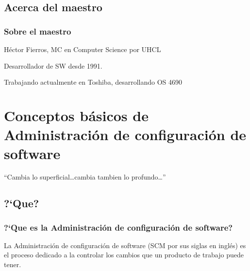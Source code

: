 \subsection{Acerca del maestro}
\begin{frame}
\frametitle{Sobre el maestro}
H\'ector Fierros, MC en Computer Science por UHCL

Desarrollador de SW desde 1991. 

Trabajando actualmente en Toshiba, desarrollando OS 4690
\end{frame}

\section{Conceptos b\'asicos de Administraci\'on de configuraci\'on de software}
\begin{frame}
\begin{exampleblock}{}
  {\large ``Cambia lo superficial\ldots cambia tambien lo profundo\ldots''}
  \vskip5mm
  \hspace*{}
\end{exampleblock}
\end{frame}
\subsection{?`Que?}
\begin{frame}
\frametitle{?`Que es la Administraci\'on de configuraci\'on de software?}

\begin{definicion}
La \alert{Administraci\'on de configuraci\'on de software} (SCM por sus siglas
en ingl\'es) es el proceso dedicado a la controlar los cambios que un producto
de trabajo puede tener. 
\end{definicion}

\end{frame}

